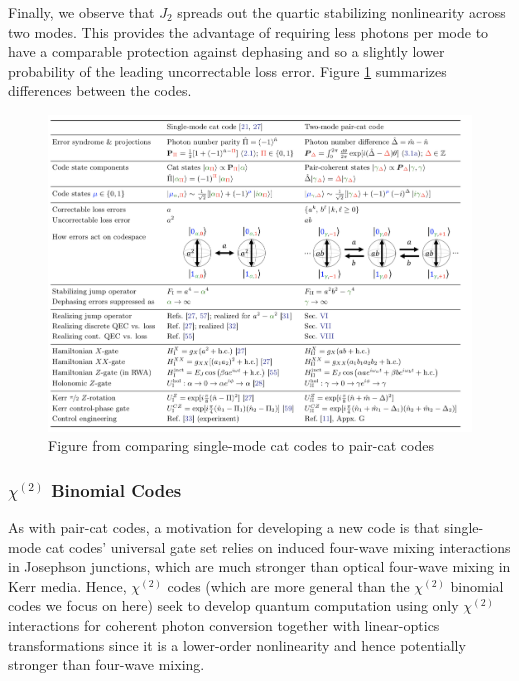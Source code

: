 \documentclass[12]{amsart}
\newcommand\0{\mathbf{0}}
\newcommand\<{\langle}
\renewcommand\>{\rangle}
\begin{document}
Finally, we observe that $J_2$ spreads out the quartic stabilizing nonlinearity across two modes. This provides the advantage of requiring less photons per mode to have a comparable protection against dephasing and so a slightly lower probability of the leading uncorrectable loss error. Figure \ref{fig:cat} summarizes differences between the codes.

\begin{figure}[h]
\label{fig:cat}
\centering
\includegraphics[width=\linewidth,keepaspectratio]{pair_cat.png}	
\caption{Figure from \cite{albert2018multimode} comparing single-mode cat codes to pair-cat codes}
\end{figure}

\subsubsection{$\chi^{(2)}$ Binomial Codes}
\label{sec:multi-binom}

As with pair-cat codes, a motivation for developing a new code is that single-mode cat codes’ universal gate set relies on induced four-wave mixing interactions in Josephson junctions, which are much stronger than optical four-wave mixing in Kerr media. Hence, $\chi^{(2)}$ codes (which are more general than the $\chi^{(2)}$ binomial codes we focus on here) seek to develop quantum computation using only $\chi^{(2)}$ interactions for coherent photon conversion together with linear-optics transformations \cite{niu2018hardware} since it is a lower-order nonlinearity and hence potentially stronger than four-wave mixing.
\end{document}

